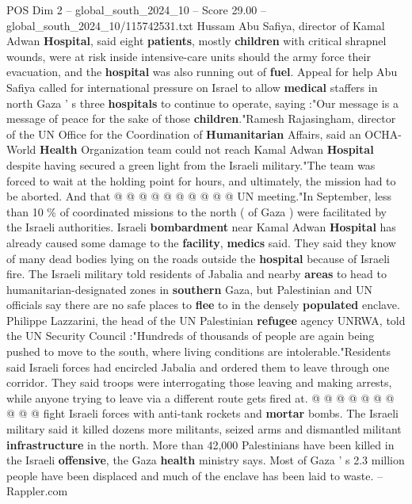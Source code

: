 \begin{textsample}{POS Dim 2 – global\_south\_2024\_10 – Score 29.00 – global\_south\_2024\_10/115742531.txt}
Hussam Abu Safiya, director of Kamal Adwan \textbf{Hospital}, said eight \textbf{patients}, mostly \textbf{children} with critical shrapnel wounds, were at risk inside intensive-care units should the army force their evacuation, and the \textbf{hospital} was also running out of \textbf{fuel}.
Appeal for help Abu Safiya called for international pressure on Israel to allow \textbf{medical} staffers in north Gaza ' s three \textbf{hospitals} to continue to operate, saying :"Our message is a message of peace for the sake of those \textbf{children}."Ramesh Rajasingham, director of the UN Office for the Coordination of \textbf{Humanitarian} Affairs, said an OCHA-World \textbf{Health} Organization team could not reach Kamal Adwan \textbf{Hospital} despite having secured a green light from the Israeli military."The team was forced to wait at the holding point for hours, and ultimately, the mission had to be aborted.
And that @ @ @ @ @ @ @ @ @ @ UN meeting."In September, less than 10 \% of coordinated missions to the north ( of Gaza ) were facilitated by the Israeli authorities.
Israeli \textbf{bombardment} near Kamal Adwan \textbf{Hospital} has already caused some damage to the \textbf{facility}, \textbf{medics} said.
They said they know of many dead bodies lying on the roads outside the \textbf{hospital} because of Israeli fire.
The Israeli military told residents of Jabalia and nearby \textbf{areas} to head to humanitarian-designated zones in \textbf{southern} Gaza, but Palestinian and UN officials say there are no safe places to \textbf{flee} to in the densely \textbf{populated} enclave.
Philippe Lazzarini, the head of the UN Palestinian \textbf{refugee} agency UNRWA, told the UN Security Council :"Hundreds of thousands of people are again being pushed to move to the south, where living conditions are intolerable."Residents said Israeli forces had encircled Jabalia and ordered them to leave through one corridor.
They said troops were interrogating those leaving and making arrests, while anyone trying to leave via a different route gets fired at. @ @ @ @ @ @ @ @ @ @ fight Israeli forces with anti-tank rockets and \textbf{mortar} bombs.
The Israeli military said it killed dozens more militants, seized arms and dismantled militant \textbf{infrastructure} in the north.
More than 42,000 Palestinians have been killed in the Israeli \textbf{offensive}, the Gaza \textbf{health} ministry says.
Most of Gaza ' s 2.3 million people have been displaced and much of the enclave has been laid to waste. -- Rappler.com

\end{textsample}
